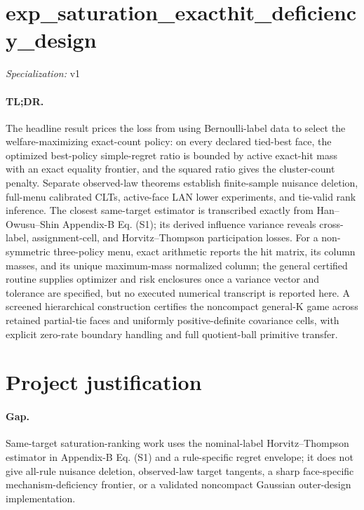 \documentclass{article}
\begin{document}
\sloppy

\section*{exp\_\allowbreak{}saturation\_\allowbreak{}exacthit\_\allowbreak{}deficiency\_\allowbreak{}design}

\noindent\textit{Specialization:} v1\par

\paragraph{TL;DR.} The headline result prices the loss from using Bernoulli-label data to select the welfare-maximizing exact-count policy: on every declared tied-best face, the optimized best-policy simple-regret ratio is bounded by active exact-hit mass with an exact equality frontier, and the squared ratio gives the cluster-count penalty. Separate observed-law theorems establish finite-sample nuisance deletion, full-menu calibrated CLTs, active-face LAN lower experiments, and tie-valid rank inference. The closest same-target estimator is transcribed exactly from Han--Owusu--Shin Appendix-B Eq. (S1); its derived influence variance reveals cross-label, assignment-cell, and Horvitz--Thompson participation losses. For a non-symmetric three-policy menu, exact arithmetic reports the hit matrix, its column masses, and its unique maximum-mass normalized column; the general certified routine supplies optimizer and risk enclosures once a variance vector and tolerance are specified, but no executed numerical transcript is reported here. A screened hierarchical construction certifies the noncompact general-K game across retained partial-tie faces and uniformly positive-definite covariance cells, with explicit zero-rate boundary handling and full quotient-ball primitive transfer.

\section{Project justification}

\paragraph{Gap.} Same-target saturation-ranking work uses the nominal-label Horvitz--Thompson estimator in Appendix-B Eq. (S1) and a rule-specific regret envelope; it does not give all-rule nuisance deletion, observed-law target tangents, a sharp face-specific mechanism-deficiency frontier, or a validated noncompact Gaussian outer-design implementation.
\end{document}
